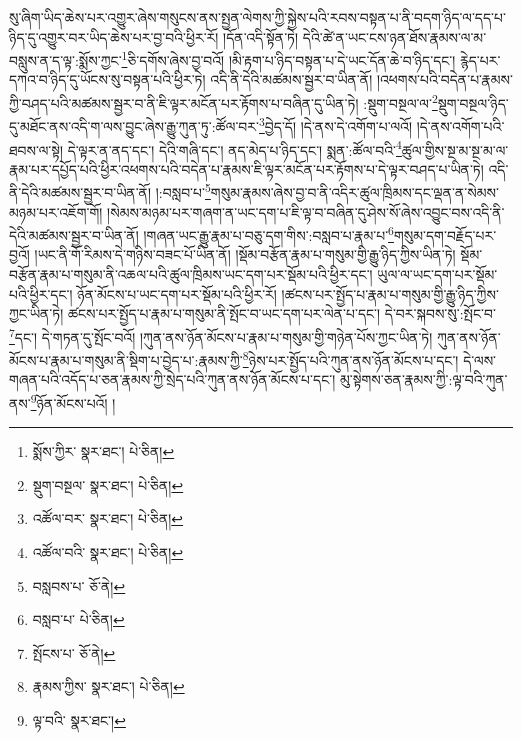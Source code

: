 སུ་ཞིག་ཡིད་ཆེས་པར་འགྱུར་ཞེས་གསུངས་ནས་སྤྱན་ལེགས་ཀྱི་སྐྱེས་པའི་རབས་བསྟན་པ་ནི་བདག་ཉིད་ལ་དད་པ་ཉིད་དུ་འགྱུར་བར་ཡིད་ཆེས་པར་བྱ་བའི་ཕྱིར་རོ། །དོན་འདི་སྟོན་ཏེ། དེའི་ཚེ་ན་ཡང་ངས་ཉན་ཐོས་རྣམས་ལ་མ་བསླུས་ན་ད་ལྟ་:སྨོས་ཀྱང་\footnote{སྨོས་ཀྱིར་  སྣར་ཐང་།  པེ་ཅིན། }ཅི་དགོས་ཞེས་བྱ་བའོ། །མི་རྟག་པ་ཉིད་བསྟན་པ་དེ་ཡང་དོན་ཆེ་བ་ཉིད་དང་། རྙེད་པར་དཀའ་བ་ཉིད་དུ་ཡོངས་སུ་བསྟན་པའི་ཕྱིར་ཏེ། འདི་ནི་དེའི་མཚམས་སྦྱར་བ་ཡིན་ནོ། །འཕགས་པའི་བདེན་པ་རྣམས་ཀྱི་བཤད་པའི་མཚམས་སྦྱར་བ་ནི་ཇི་ལྟར་མངོན་པར་རྟོགས་པ་བཞིན་དུ་ཡིན་ཏེ། :སྡུག་བསྔལ་ལ་\footnote{སྡུག་བསྔལ་  སྣར་ཐང་།  པེ་ཅིན། }སྡུག་བསྔལ་ཉིད་དུ་མཐོང་ནས་འདི་ག་ལས་བྱུང་ཞེས་རྒྱུ་ཀུན་ཏུ་:ཚོལ་བར་\footnote{འཚོལ་བར་  སྣར་ཐང་།  པེ་ཅིན། }བྱེད་དོ། །དེ་ནས་དེ་འགོག་པ་ལའོ། །དེ་ནས་འགོག་པའི་ཐབས་ལ་སྟེ། དེ་ལྟར་ན་ནད་དང་། དེའི་གཞི་དང་། ནད་མེད་པ་ཉིད་དང་། སྨན་:ཚོལ་བའི་\footnote{འཚོལ་བའི་  སྣར་ཐང་།  པེ་ཅིན། }ཚུལ་གྱིས་སྔ་མ་སྔ་མ་ལ་རྣམ་པར་དཔྱོད་པའི་ཕྱིར་འཕགས་པའི་བདེན་པ་རྣམས་ཇི་ལྟར་མངོན་པར་རྟོགས་པ་དེ་ལྟར་བཤད་པ་ཡིན་ཏེ། འདི་ནི་དེའི་མཚམས་སྦྱར་བ་ཡིན་ནོ། །:བསླབ་པ་\footnote{བསླབས་པ་  ཅོ་ནེ། }གསུམ་རྣམས་ཞེས་བྱ་བ་ནི་འདིར་ཚུལ་ཁྲིམས་དང་ལྡན་ན་སེམས་མཉམ་པར་འཇོག་གོ། །སེམས་མཉམ་པར་གཞག་ན་ཡང་དག་པ་ཇི་ལྟ་བ་བཞིན་དུ་ཤེས་སོ་ཞེས་འབྱུང་བས་འདི་ནི་དེའི་མཚམས་སྦྱར་བ་ཡིན་ནོ། །གཞན་ཡང་རྒྱུ་རྣམ་པ་བཅུ་དག་གིས་:བསླབ་པ་རྣམ་པ་\footnote{བསླབ་པ་  པེ་ཅིན། }གསུམ་དག་བརྗོད་པར་བྱའོ། །ཡང་ནི་གོ་རིམས་དེ་གཉིས་བཟང་པོ་ཡིན་ནོ། །སྡོམ་བརྩོན་རྣམ་པ་གསུམ་གྱི་རྒྱུ་ཉིད་ཀྱིས་ཡིན་ཏེ། སྡོམ་བརྩོན་རྣམ་པ་གསུམ་ནི་འཆལ་པའི་ཚུལ་ཁྲིམས་ཡང་དག་པར་སྡོམ་པའི་ཕྱིར་དང་། ཡུལ་ལ་ཡང་དག་པར་སྡོམ་པའི་ཕྱིར་དང་། ཉོན་མོངས་པ་ཡང་དག་པར་སྡོམ་པའི་ཕྱིར་རོ། །ཚངས་པར་སྤྱོད་པ་རྣམ་པ་གསུམ་གྱི་རྒྱུ་ཉིད་ཀྱིས་ཀྱང་ཡིན་ཏེ། ཚངས་པར་སྤྱོད་པ་རྣམ་པ་གསུམ་ནི་སྤོང་བ་ཡང་དག་པར་ལེན་པ་དང་། དེ་བར་སྐབས་སུ་:སྤོང་བ་\footnote{སྤོངས་པ་  ཅོ་ནེ། }དང་། དེ་གཏན་དུ་སྤོང་བའོ། །ཀུན་ནས་ཉོན་མོངས་པ་རྣམ་པ་གསུམ་གྱི་གཉེན་པོས་ཀྱང་ཡིན་ཏེ། ཀུན་ནས་ཉོན་མོངས་པ་རྣམ་པ་གསུམ་ནི་སྡིག་པ་བྱེད་པ་:རྣམས་ཀྱི་\footnote{རྣམས་ཀྱིས་  སྣར་ཐང་།  པེ་ཅིན། }ཉེས་པར་སྤྱོད་པའི་ཀུན་ནས་ཉོན་མོངས་པ་དང་། དེ་ལས་གཞན་པའི་འདོད་པ་ཅན་རྣམས་ཀྱི་སྲེད་པའི་ཀུན་ནས་ཉོན་མོངས་པ་དང་། མུ་སྟེགས་ཅན་རྣམས་ཀྱི་:ལྟ་བའི་ཀུན་ནས་\footnote{ལྟ་བའི་  སྣར་ཐང་། }ཉོན་མོངས་པའོ། །
